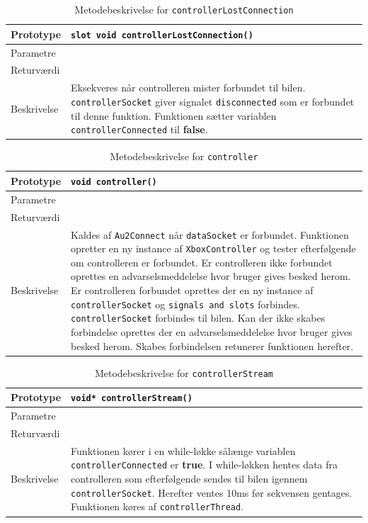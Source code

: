 \begin{table}[H]
\begin{tabularx}{\textwidth}{| L{2.5 cm} | Z |} \hline
Prototype & \texttt{slot void controllerLostConnection()} \\\hline
Parametre &   \\\hline
Returværdi &  \\\hline
Beskrivelse & Eksekveres når controlleren mister forbundet til bilen. \texttt{controllerSocket} giver signalet \texttt{disconnected} som er forbundet til denne funktion. Funktionen sætter variablen \texttt{controllerConnected} til \textbf{false}.   \\\hline
\end{tabularx}
\caption{Metodebeskrivelse for \texttt{controllerLostConnection}}
\label{table:met_ccontrollerLostConnection}
\end{table}

\begin{table}[H]
\begin{tabularx}{\textwidth}{| L{2.5 cm} | Z |} \hline
Prototype & \texttt{void controller()} \\\hline
Parametre &   \\\hline
Returværdi &  \\\hline
Beskrivelse & Kaldes af \texttt{Au2Connect} når \texttt{dataSocket} er forbundet. Funktionen opretter en ny instance af \texttt{XboxController} og tester efterfølgende om controlleren er forbundet. Er controlleren ikke forbundet oprettes en advarselsmeddelelse hvor bruger gives besked herom. Er controlleren forbundet oprettes der en ny instance af \texttt{controllerSocket} og \texttt{signals and slots} forbindes. \texttt{controllerSocket} forbindes til bilen. Kan der ikke skabes forbindelse oprettes der en advarselsmeddelelse hvor bruger gives besked herom. Skabes forbindelsen retunerer funktionen herefter.  \\\hline
\end{tabularx}
\caption{Metodebeskrivelse for \texttt{controller}}
\label{table:met_controller}
\end{table}

\begin{table}[H]
\begin{tabularx}{\textwidth}{| L{2.5 cm} | Z |} \hline
Prototype & \texttt{void* controllerStream()} \\\hline
Parametre &   \\\hline
Returværdi &  \\\hline
Beskrivelse & Funktionen kører i en while-løkke sålænge variablen \texttt{controllerConnected} er \textbf{true}. I while-løkken hentes data fra controlleren som efterfølgende sendes til bilen igennem \texttt{controllerSocket}. Herefter ventes 10ms før sekvensen gentages. Funktionen køres af \texttt{controllerThread}.\\\hline
\end{tabularx}
\caption{Metodebeskrivelse for \texttt{controllerStream}}
\label{table:met_controllerStream}
\end{table}

